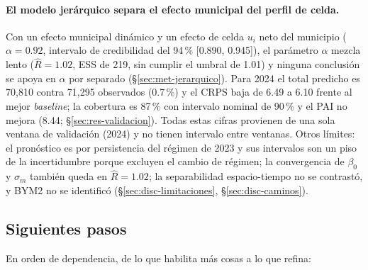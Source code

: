 \paragraph{El modelo jerárquico separa el efecto municipal del perfil de celda.}
Con un efecto municipal dinámico y un efecto de celda $u_i$ neto del municipio
($\alpha = 0.92$, intervalo de credibilidad del 94\,\% [0.890, 0.945]), el
parámetro $\alpha$ mezcla lento ($\hat{R} = 1.02$, ESS de 219, sin cumplir el
umbral de 1.01) y ninguna conclusión se apoya en $\alpha$ por separado
(§\ref{sec:met-jerarquico}). Para 2024 el total predicho es 70,810 contra
71,295 observados (0.7\,\%) y el CRPS baja de 6.49 a 6.10 frente al mejor
\emph{baseline}; la cobertura es 87\,\% con intervalo nominal de 90\,\% y el
PAI no mejora (8.44; §\ref{sec:res-validacion}). Todas estas cifras provienen
de una sola ventana de validación (2024) y no tienen intervalo entre ventanas.
Otros límites: el pronóstico es por persistencia del régimen de 2023 y sus
intervalos son un piso de la incertidumbre porque excluyen el cambio de
régimen; la convergencia de $\beta_0$ y $\sigma_m$ también queda en
$\hat{R} = 1.02$; la separabilidad espacio-tiempo no se contrastó, y BYM2 no se
identificó (§\ref{sec:disc-limitaciones}, §\ref{sec:disc-caminos}).

\subsection{Siguientes pasos}\label{sec:conclusiones-pasos}

En orden de dependencia, de lo que habilita más cosas a lo que refina:


